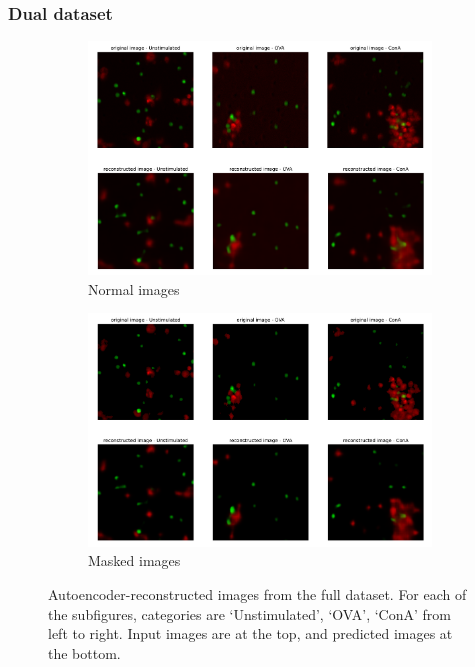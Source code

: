 \bigskip
\subsubsection{Dual dataset}
\hfill
\hfill

\begin{figure}[h!]
    \centering
    \begin{subfigure}[h!]{0.45\textwidth}
        \includegraphics[width=\textwidth]{dissertation/figures/CK19_reconstruction.png}
        \caption{Normal images}
    \end{subfigure}
    \begin{subfigure}[h!]{0.45\textwidth}
        \includegraphics[width=\textwidth]{dissertation/figures/CK19_masked_reconstruction.png}
        \caption{Masked images}
    \end{subfigure}
    \caption{Autoencoder-reconstructed images from the full dataset. For each of the subfigures, categories are `Unstimulated', `OVA', `ConA' from left to right. Input images are at the top, and predicted images at the bottom.}
    \label{fig:my_label}
\end{figure}

